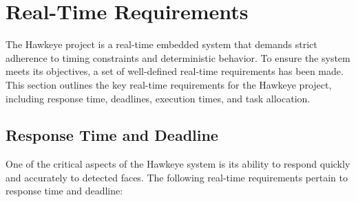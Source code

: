 \documentclass[a4paper,11pt]{article}%
\begin{document}
\section{Real-Time Requirements}
The Hawkeye project is a real-time embedded system that demands strict adherence to timing constraints and deterministic behavior. To ensure the system meets its objectives, a set of well-defined real-time requirements has been made. This section outlines the key real-time requirements for the Hawkeye project, including response time, deadlines, execution times, and task allocation.
\subsection{Response Time and Deadline}
One of the critical aspects of the Hawkeye system is its ability to respond quickly and accurately to detected faces. The following real-time requirements pertain to response time and deadline:
\end{document}
